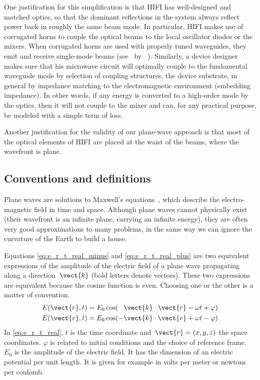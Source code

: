 One justification for this simplification is that HIFI has well-designed and matched optics, so that the dominant reflections in the system always reflect power back in roughly the same beam mode.
In particular, HIFI makes use of corrugated horns to couple the optical beams to the local oscillator diodes or the mixers.
When corrugated horns are used with properly tuned waveguides, they emit and receive single-mode beams (see~ by \citeauthor{clarricoats1966propagation}~\cite{clarricoats1966propagation}).
Similarly, a device designer makes sure that his microwave circuit will optimally couple to the fundamental waveguide mode by selection of coupling structures, the device substrate, in general by impedance matching to the electromagnetic environment (embedding impedance).
In other words, if any energy is converted to a high-order mode by the optics, then it will not couple to the mixer and can, for any practical purpose, be modeled with a simple term of loss.

Another justification for the validity of our plane-wave approach is that most of the optical elements of HIFI are placed at the waist of the beams, where the wavefront is plane.

\subsection{Conventions and definitions}
Plane waves are solutions to Maxwell's equations~\cite{hecht2002optics}, which describe the electro-magnetic field in time and space.
Although plane waves cannot physically exist (their wavefront is an infinite plane, carrying an infinite energy), they are often very good approximations to many problems, in the same way we can ignore the curvature of the Earth to build a house.

Equations \eqref{eq:e_r_t_real_minus} and \eqref{eq:e_r_t_real_plus} are two equivalent expressions of the amplitude of the electric field of a plane wave propagating along a direction~$\vect{k}$ (bold letters denote vectors).
These two expressions are equivalent because the cosine function is even.
Choosing one or the other is a matter of convention.
\begin{subequations}
    \begin{align}
       E(\vect{r}, t) &= E_0 \cos(\phantom{-}\vect{k}\cdot \vect{r} - \omega t + \varphi)   \label{eq:e_r_t_real_minus} \\
       E(\vect{r}, t) &= E_0 \cos(-          \vect{k}\cdot \vect{r} + \omega t - \varphi)   \label{eq:e_r_t_real_plus}
    \end{align}
    \label{eq:e_r_t_real}
\end{subequations}
In \cref{eq:e_r_t_real}, $t$ is the time coordinate and~$\vect{r}=(x, y, z)$ the space coordinates.
$\varphi$ is related to initial conditions and the choice of reference frame.
$E_0$ is the amplitude of the electric field.
It has the dimension of an electric potential per unit length.
It is given for example in volts per meter or newtons per coulomb.

